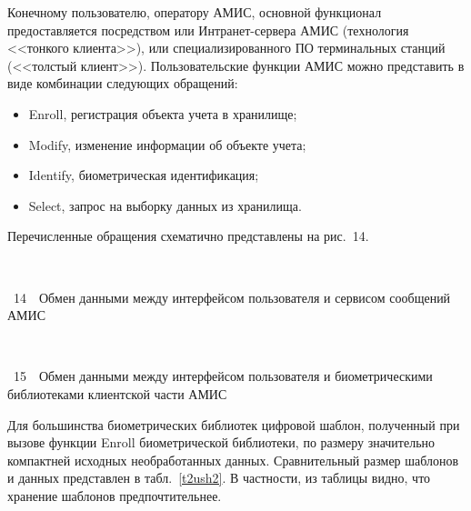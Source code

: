 \begin{multicols}{2}
  Конечному пользователю, оператору АМИС, основной функционал 
предоставляется посредством или Интранет-сервера АМИС (технология 
<<тонкого клиента>>), или специализированного ПО терминальных станций 
(<<толстый клиент>>). Пользовательские функции АМИС можно представить 
в виде комбинации следующих обращений:
\begin{itemize}
\item Enroll, регистрация объекта учета в хранилище;\\[-13pt]
\item Modify, изменение информации об объекте %
\mbox{учета};\\[-13pt]
\item Identify, биометрическая идентификация;\\[-13pt]
\item Select, запрос на выборку данных из храни\-лища.\\[-13pt]  
  \end{itemize}
  
  Перечисленные  обращения схематично представлены на рис.~14.
    \medskip

\vspace*{1pt}
\begin{center}
\mbox{%
\epsfxsize=75mm   %
 }
\end{center}
\vspace*{2pt}
{{\figurename~14}\ \ \small{Обмен данными между интерфейсом пользователя и сервисом 
сообщений АМИС}}

\addtocounter{figure}{1}    
 
 

\vspace*{1pt}
\begin{center}
\mbox{%
\epsfxsize=79.801mm  
 }
\end{center}
\vspace*{3pt}
{{\figurename~15}\ \ \small{Обмен данными между интерфейсом пользователя и 
биометрическими библиотеками клиентской части АМИС}}
\bigskip
\medskip
\addtocounter{figure}{1}  

  Для большинства биометрических библиотек цифровой шаблон, полученный 
при вызове функции Enroll биометрической библиотеки, по размеру 
значительно компактней исходных необработанных данных. Сравнительный 
размер шаблонов и данных представлен в табл.~\ref{t2ush2}. В частности, из 
таблицы видно, что хранение шаблонов предпочтительнее.
  


\end{multicols}
